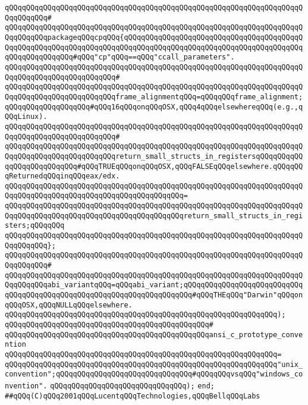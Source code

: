 \verb|qQQqqQQqqQQqqQQqqQQqqQQqqQQqqQQqqQQqqQQqqQQqqQQqqQQqqQQqqQQqqQQqqQQqqQQqqQQqqQQq#|\newline
\verb|qQQqqQQqqQQqqQQqqQQqqQQqqQQqqQQqqQQqqQQqqQQqqQQqqQQqqQQqqQQqqQQqqQQqqQQqqQQqqQQqpackageqQQqcpqQQq{qQQqqQQqqQQqqQQqqQQqqQQqqQQqqQQqqQQqqQQqqQQqqQQqqQQqqQQqqQQqqQQqqQQqqQQqqQQqqQQqqQQqqQQqqQQqqQQqqQQqqQQqqQQqqQQqqQQqqQQqqQQqqQQq#qQQq"cp"qQQq==qQQq"ccall_parameters".|\newline
\verb|qQQqqQQqqQQqqQQqqQQqqQQqqQQqqQQqqQQqqQQqqQQqqQQqqQQqqQQqqQQqqQQqqQQqqQQqqQQqqQQqqQQqqQQqqQQqqQQq#|\newline
\verb|qQQqqQQqqQQqqQQqqQQqqQQqqQQqqQQqqQQqqQQqqQQqqQQqqQQqqQQqqQQqqQQqqQQqqQQqqQQqqQQqqQQqqQQqqQQqqQQqframe_alignmentqQQq=qQQqqQQqframe_alignment;qQQqqQQqqQQqqQQqqQQq#qQQq16qQQqonqQQqOSX,qQQq4qQQqelsewhereqQQq(e.g.,qQQqLinux).|\newline
\verb|qQQqqQQqqQQqqQQqqQQqqQQqqQQqqQQqqQQqqQQqqQQqqQQqqQQqqQQqqQQqqQQqqQQqqQQqqQQqqQQqqQQqqQQqqQQqqQQq#|\newline
\verb|qQQqqQQqqQQqqQQqqQQqqQQqqQQqqQQqqQQqqQQqqQQqqQQqqQQqqQQqqQQqqQQqqQQqqQQqqQQqqQQqqQQqqQQqqQQqqQQqreturn_small_structs_in_registersqQQqqQQqqQQqqQQqqQQqqQQqqQQq#qQQqTRUEqQQqonqQQqOSX,qQQqFALSEqQQqelsewhere.qQQqqQQqReturnedqQQqinqQQqeax/edx.|\newline
\verb|qQQqqQQqqQQqqQQqqQQqqQQqqQQqqQQqqQQqqQQqqQQqqQQqqQQqqQQqqQQqqQQqqQQqqQQqqQQqqQQqqQQqqQQqqQQqqQQqqQQqqQQqqQQqqQQq=|\newline
\verb|qQQqqQQqqQQqqQQqqQQqqQQqqQQqqQQqqQQqqQQqqQQqqQQqqQQqqQQqqQQqqQQqqQQqqQQqqQQqqQQqqQQqqQQqqQQqqQQqqQQqqQQqqQQqqQQqreturn_small_structs_in_registers;qQQqqQQq|\newline
\verb|qQQqqQQqqQQqqQQqqQQqqQQqqQQqqQQqqQQqqQQqqQQqqQQqqQQqqQQqqQQqqQQqqQQqqQQqqQQqqQQq};|\newline
\verb|qQQqqQQqqQQqqQQqqQQqqQQqqQQqqQQqqQQqqQQqqQQqqQQqqQQqqQQqqQQqqQQqqQQqqQQqqQQqqQQq#|\newline
\verb|qQQqqQQqqQQqqQQqqQQqqQQqqQQqqQQqqQQqqQQqqQQqqQQqqQQqqQQqqQQqqQQqqQQqqQQqqQQqqQQqabi_variantqQQq=qQQqabi_variant;qQQqqQQqqQQqqQQqqQQqqQQqqQQqqQQqqQQqqQQqqQQqqQQqqQQqqQQqqQQqqQQqqQQqqQQq#qQQqTHEqQQq"Darwin"qQQqonqQQqOSX,qQQqNULLqQQqelsewhere.|\newline
\verb|qQQqqQQqqQQqqQQqqQQqqQQqqQQqqQQqqQQqqQQqqQQqqQQqqQQqqQQqqQQqqQQq);|\newline
\verb|qQQqqQQqqQQqqQQqqQQqqQQqqQQqqQQqqQQqqQQqqQQqqQQq#|\newline
\verb|qQQqqQQqqQQqqQQqqQQqqQQqqQQqqQQqqQQqqQQqqQQqqQQqansi_c_prototype_convention|\newline
\verb|qQQqqQQqqQQqqQQqqQQqqQQqqQQqqQQqqQQqqQQqqQQqqQQqqQQqqQQqqQQqqQQq=|\newline
\verb|qQQqqQQqqQQqqQQqqQQqqQQqqQQqqQQqqQQqqQQqqQQqqQQqqQQqqQQqqQQqqQQq"unix_convention";qQQqqQQqqQQqqQQqqQQqqQQqqQQqqQQq#qQQqqQQqvsqQQq"windows_convention".|\newline
\verb|qQQqqQQqqQQqqQQqqQQqqQQqqQQqqQQq);|\newline
\verb|end;|\newline
\newline
\newline
\verb|##qQQq(C)qQQq2001qQQqLucentqQQqTechnologies,qQQqBellqQQqLabs|\newline

